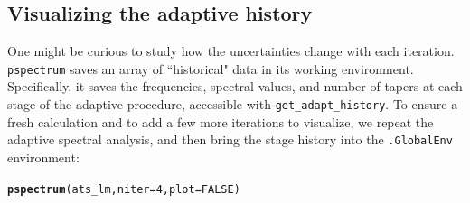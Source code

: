 \documentclass[10pt]{article}\usepackage[]{graphicx}\usepackage[]{color}
\makeatletter
\newcommand{\hlnum}[1]{\textcolor[rgb]{0.686,0.059,0.569}{#1}}%
\newcommand{\hlstd}[1]{\textcolor[rgb]{0.345,0.345,0.345}{#1}}%
\newcommand{\hlkwc}[1]{\textcolor[rgb]{0.333,0.667,0.333}{#1}}%
\newcommand{\hlkwd}[1]{\textcolor[rgb]{0.737,0.353,0.396}{\textbf{#1}}}%
\newenvironment{kframe}{%
 \def\at@end@of@kframe{}%
 \ifinner\ifhmode%
  \def\at@end@of@kframe{\end{minipage}}%
  \begin{minipage}{\columnwidth}%
 \fi\fi%
 \def\FrameCommand##1{\hskip\@totalleftmargin \hskip-\fboxsep
 \colorbox{shadecolor}{##1}\hskip-\fboxsep
     \hskip-\linewidth \hskip-\@totalleftmargin \hskip\columnwidth}%
 \MakeFramed {\advance\hsize-\width
   \@totalleftmargin\z@ \linewidth\hsize
   \@setminipage}}%
 {\par\unskip\endMakeFramed%
 \at@end@of@kframe}
\newenvironment{knitrout}{}{} %
\newcommand{\Rcmd}[1]{\texttt{#1}}
\makeatother
\begin{document}
\subsection{Visualizing the adaptive history}
One might be curious to study how the
uncertainties change with each iteration.
\Rcmd{pspectrum}
 saves an array of ``historical" data in its working environment.
 Specifically, it saves the frequencies,
 spectral values, and number of tapers at each stage of the adaptive
 procedure, accessible with \Rcmd{get\_adapt\_history}.
 To ensure a fresh calculation and to 
 add a few more iterations to visualize, 
we repeat the adaptive spectral analysis, 
and then bring the stage history into the \Rcmd{.GlobalEnv} environment:
\begin{knitrout}
\color{fgcolor}\begin{kframe}
\begin{alltt}
\hlkwd{pspectrum}\hlstd{(ats_lm,} \hlkwc{niter}\hlstd{=}\hlnum{4}\hlstd{,} \hlkwc{plot}\hlstd{=}\hlnum{FALSE}\hlstd{)}
\end{alltt}


{\ttfamily\noindent\itshape\color{messagecolor}{\#\# Stage\ \ 0 est. (pilot) \\\#\# 	environment\ \ ** .psdEnv **\ \ refreshed\\\#\# detrending (and demeaning)\\\#\# 1024 --> 1024}}

{\ttfamily\noindent\color{warningcolor}{\#\# Warning in psdcore.default(X.d = xo, X.frq = x.frqsamp, ntaper = kopt, preproc = FALSE, : zero taper result. careful with these results!}}

{\ttfamily\noindent\itshape\color{messagecolor}{\#\# 1024 --> 1025}}

{\ttfamily\noindent\color{warningcolor}{\#\# Warning in psdcore.default(X.d = xo, X.frq = x.frqsamp, ntaper = kopt, preproc = FALSE, : psd ests.\ \ !=\ \ no. taps}}

{\ttfamily\noindent\itshape\color{messagecolor}{\#\# Stage\ \ 1 est. (Ave. S.V.R. 24.5 dB)}}


\end{kframe}
\end{knitrout}
\end{document}
